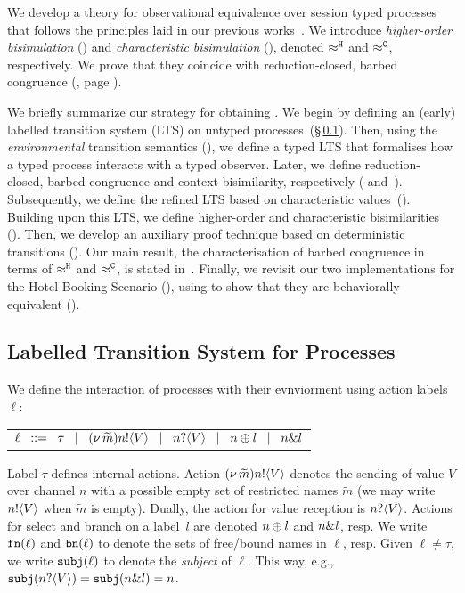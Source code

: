 
\noi
We develop a theory for observational equivalence over
session typed \HOp processes that follows the principles
laid in our previous works~\cite{KYHH2015,KY2015}.
We introduce \emph{higher-order bisimulation} ()
and
\emph{characteristic bisimulation} (), 
denoted $\approx^\mathtt{H}$ and $\approx^\mathtt{C}$, respectively.
We prove that
they coincide with reduction-closed,
barbed congruence (, page \pageref{the:coincidence}).

We briefly summarize our strategy for obtaining .
We begin by defining an (early) labelled transition system (LTS) on
untyped processes~(\S\,\ref{ss:lts}). 
Then, using the \emph{environmental} transition semantics (), 
we define a typed LTS that formalises 
how a typed process interacts with a typed observer. 
Later,  we define 
reduction-closed, barbed congruence and 
context bisimilarity, respectively ( and~). 
Subsequently, 
we define the refined LTS based on characteristic values~().
Building upon this LTS, 
we define
higher-order  and  characteristic bisimilarities  ().
Then, we develop an auxiliary  proof technique based on deterministic transitions ().
Our main result, the 
characterisation of barbed congruence in terms of $\approx^\mathtt{H}$ and $\approx^\mathtt{C}$, is stated in~.
Finally, we revisit our two implementations for the Hotel Booking Scenario (), 
using  
to show that they are behaviorally equivalent ().

\subsection{Labelled Transition System for Processes}
\label{ss:lts}

We define the interaction of processes with their evnviorment using action labels $\ell$:
%
\begin{center}
	\begin{tabular}{l}
		$\ell
			\;\;::=\;\;  \tau 
						\;\;\;|\;\;\;	(\nu\, \widetilde{m}) n ! \langle V \rangle
			\;\;\;|\;\;\;	n ? \langle V \rangle 
			\;\;\;|\;\;\;	n \oplus l 
			\;\;\;|\;\;\;	n \& l$
	\end{tabular}
\end{center}
%
\noi 
Label $\tau$ defines internal actions.
Action
$(\nu\, \widetilde{m}) n ! \langle V \rangle$
denotes the sending of value $V$
over channel $n$ with a possible empty set of restricted names
$\widetilde{m}$ 
(we may write $n ! \langle V \rangle$ when $\widetilde{m}$ is empty).
Dually, the action for value reception is 
$n ? \langle V \rangle$.
Actions for select and branch on
a label~$l$ are denoted $n \oplus l$ and $n \& l$, resp.
We write $\mathtt{fn}(\ell)$ and $\mathtt{bn}(\ell)$ to denote the
sets of free/bound names in $\ell$, resp.
Given $\ell \neq \tau$, we write $\mathtt{subj}(\ell)$
to denote the \emph{subject} of $\ell$.
This way, e.g., $\mathtt{subj}(n ? \langle V \rangle) = \mathtt{subj}(n \& l) = n$.

